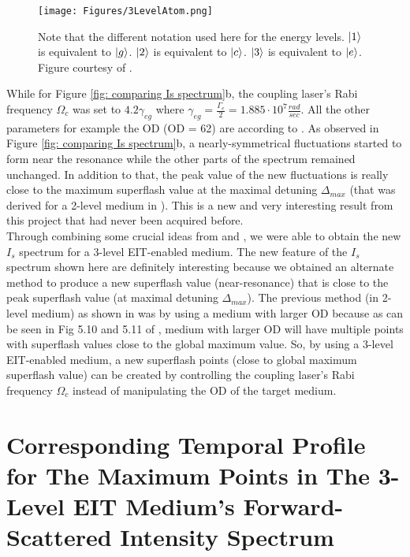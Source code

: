 \begin{figure}[h!]
    \centering
    \texttt{[image: Figures/3LevelAtom.png]}
    \caption{Note that the different notation used here for the energy levels. $\ket{1}$ is equivalent to $\ket{g}$. $\ket{2}$ is equivalent to $\ket{c}$. $\ket{3}$ is equivalent to $\ket{e}$. Figure courtesy of \cite{Jeong2009}.}
    \label{fig: 3LevelAtom}
\end{figure}

While for Figure \ref{fig: comparing Is spectrum}b, the coupling laser's Rabi frequency $\Omega_{c}$ was set to $4.2\gamma_{eg}$ where $\gamma_{eg} = \frac{\Gamma_{e}}{2} = 1.885 \cdot 10^{7} \frac{rad}{sec}$. All the other parameters for example the OD (OD = 62) are according to \cite{jeong2010slow}. As observed in Figure \ref{fig: comparing Is spectrum}b, a nearly-symmetrical fluctuations started to form near the resonance while the other parts of the spectrum remained unchanged. In addition to that, the peak value of the new fluctuations is really close to the maximum superflash value at the maximal detuning $\Delta_{max}$ (that was derived for a 2-level medium in \cite{Kwong2017}). This is a new and very interesting result from this project that had never been acquired before.\\

Through combining some crucial ideas from \cite{Kwong2014} and \cite{jeong2010slow}, we were able to obtain the new $I_{s}$ spectrum for a 3-level EIT-enabled medium. The new feature of the $I_{s}$ spectrum shown here are definitely interesting because we obtained an alternate method to produce a new superflash value (near-resonance) that is close to the peak superflash value (at maximal detuning $\Delta_{max}$). The previous method (in 2-level medium) as shown in \cite{Kwong2017} was by using a medium with larger OD because as can be seen in Fig 5.10 and 5.11 of \cite{Kwong2017}, medium with larger OD will have multiple points with superflash values close to the global maximum value. So, by using a 3-level EIT-enabled medium, a new superflash points (close to global maximum superflash value) can be created by controlling the coupling laser's Rabi frequency $\Omega_{c}$ instead of manipulating the OD of the target medium.


\section{Corresponding Temporal Profile for The Maximum Points in The 3-Level EIT Medium's Forward-Scattered Intensity Spectrum}

